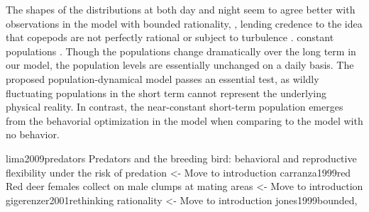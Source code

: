 The shapes of the distributions at both day and night seem to agree better with observations in the model with bounded rationality, \citep{hay1991zooplankton}, lending credence to the idea that copepods are not perfectly rational or subject to turbulence \citep{visser2001observations}.
constant populations \citep{pinti2019trophic,verticalmigration}. Though the populations change dramatically over the long term in our model, the population levels are essentially unchanged on a daily basis. The proposed population-dynamical model passes an essential test, as wildly fluctuating populations in the short term cannot represent the underlying physical reality. In contrast, the near-constant short-term population emerges from the behavorial optimization in the model when comparing to the model with no behavior.


lima2009predators Predators and the breeding bird: behavioral and reproductive flexibility under the risk of predation <- Move to introduction
carranza1999red Red deer females collect on male clumps at mating areas <- Move to introduction
gigerenzer2001rethinking rationality <- Move to introduction
jones1999bounded,
